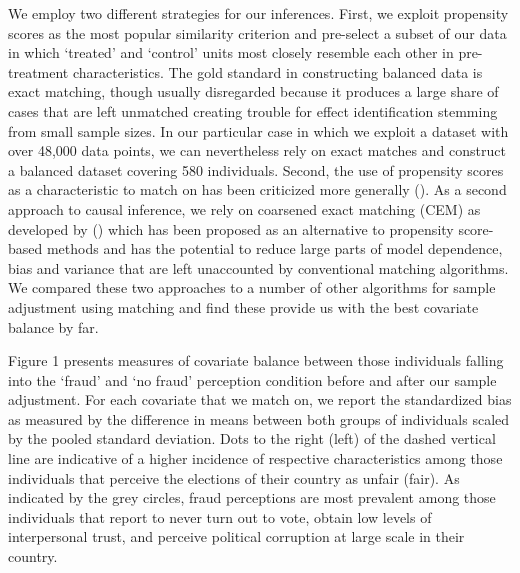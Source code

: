 \documentclass[11pt, ngerman,english,a4]{article}
\begin{document}
We employ two different strategies for our inferences. First, we exploit propensity scores as the most popular similarity criterion and pre-select a subset of our data in which `treated' and `control' units most closely resemble each other in pre-treatment characteristics. The gold standard in constructing balanced data is exact matching, though usually disregarded because it produces a large share of cases that are left unmatched creating trouble for effect identification stemming from small sample sizes. In our particular case in which we exploit a dataset with over 48,000 data points, we can nevertheless rely on exact matches and construct a balanced dataset covering 580 individuals. Second, the use of propensity scores as a characteristic to match on has been criticized more generally (\citealt{King2019}). As a second approach to causal inference, we rely on coarsened exact matching (CEM) as developed by (\citealt{Iacus2012}) which has been proposed as an alternative to propensity score-based methods and has the potential to reduce large parts of model dependence, bias and variance that are left unaccounted by conventional matching algorithms. We compared these two approaches to a number of other algorithms for sample adjustment using matching and find these provide us with the best covariate balance by far. 

Figure 1 presents measures of covariate balance between those individuals falling into the `fraud' and `no fraud' perception condition before and after our sample adjustment. For each covariate that we match on, we report the standardized bias as measured by the difference in means between both groups of individuals scaled by the pooled standard deviation. Dots to the right (left) of the dashed vertical line are indicative of a higher incidence of respective characteristics among those individuals that perceive the elections of their country as unfair (fair). As indicated by the grey circles, fraud perceptions are most prevalent among those individuals that report to never turn out to vote, obtain low levels of interpersonal trust, and perceive political corruption at large scale in their country. 
\end{document}
